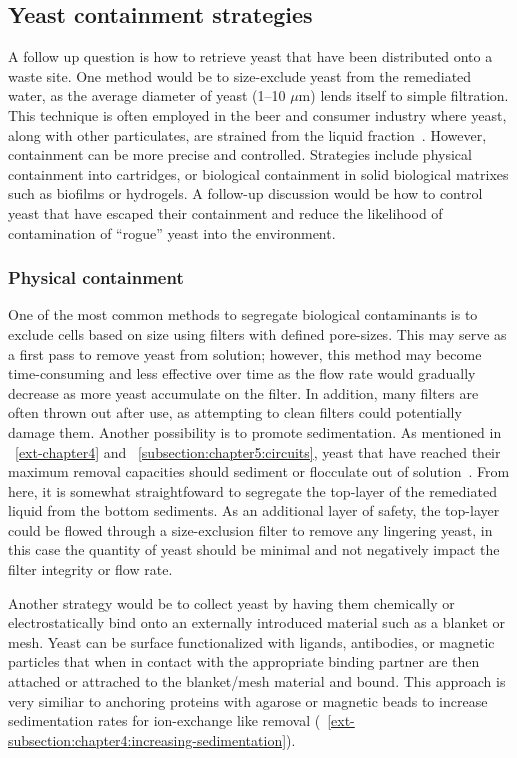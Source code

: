 \documentclass[../main/main]{subfiles}
\begin{document}
\subsection{Yeast containment strategies}
\label{subsection:chapter5:containment}
A follow up question is how to retrieve yeast that have been distributed onto a waste site. One method would be to size-exclude yeast from the remediated water, as the average diameter of yeast (1--10 $\mu$m) lends itself to simple filtration. This technique is often employed in the beer and consumer industry where yeast, along with other particulates, are strained from the liquid fraction~\cite{harrison2015}. However, containment can be more precise and controlled. Strategies include physical containment into cartridges, or biological containment in solid biological matrixes such as biofilms or hydrogels. A follow-up discussion would be how to control yeast that have escaped their containment and reduce the likelihood of contamination of ``rogue'' yeast into the environment.

\subsubsection*{Physical containment}
One of the most common methods to segregate biological contaminants is to exclude cells based on size using filters with defined pore-sizes. This may serve as a first pass to remove yeast from solution; however, this method may become time-consuming and less effective over time as the flow rate would gradually decrease as more yeast accumulate on the filter. In addition, many filters are often thrown out after use, as attempting to clean filters could potentially damage them. Another possibility is to promote sedimentation. As mentioned in \CHAPTER~\ref{ext-chapter4} and \SECTION~\ref{subsection:chapter5:circuits}, yeast that have reached their maximum removal capacities should sediment or flocculate out of solution~\cite{verstrepen2006}. From here, it is somewhat straightfoward to segregate the top-layer of the remediated liquid from the bottom sediments. As an additional layer of safety, the top-layer could be flowed through a size-exclusion filter to remove any lingering yeast, in this case the quantity of yeast should be minimal and not negatively impact the filter integrity or flow rate.

Another strategy would be to collect yeast by having them chemically or electrostatically bind onto an externally introduced material such as a blanket or mesh. Yeast can be surface functionalized with ligands, antibodies, or magnetic particles that when in contact with the appropriate binding partner are then attached or attrached to the blanket/mesh material and bound.
This approach is very similiar to anchoring proteins with agarose or magnetic beads to increase sedimentation rates for ion-exchange like removal (\CHAPTER~\ref{ext-subsection:chapter4:increasing-sedimentation}).
\end{document}
